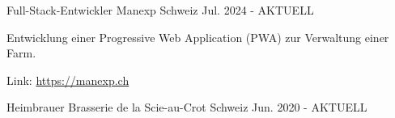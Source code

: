 

\begin{cventries}

    \cventry
    {Full-Stack-Entwickler} %
    {Manexp} %
    {Schweiz} %
    {Jul. 2024 - AKTUELL} %
    {
      \begin{cvitems} %
        \item {Entwicklung einer Progressive Web Application (PWA) zur Verwaltung einer Farm.}
        \item {Link: \href{https://manexp.ch}{https://manexp.ch}}
      \end{cvitems}
    }

    \cventry
    {Heimbrauer} %
    {Brasserie de la Scie-au-Crot} %
    {Schweiz} %
    {Jun. 2020 - AKTUELL} %
    {}

\end{cventries}

